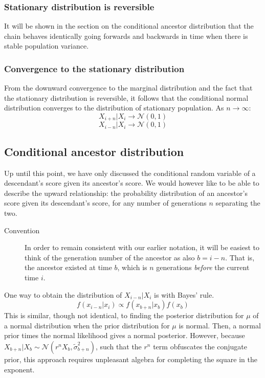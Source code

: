 \documentclass[letterpaper,10pt]{article} %
\begin{document}
\subsubsection*{Stationary distribution is reversible}
It will be shown in the section on the conditional ancestor distribution that the chain behaves identically going forwards and backwards in time when there is stable population variance.

\subsubsection*{Convergence to the stationary distribution}

From the downward convergence to the marginal distribution and the fact that the stationary distribution is reversible, it follows that the conditional normal distribution converges to the distribution of stationary population. 
As $n \rightarrow \infty$:
$$X_{i+n}|X_i \rightarrow \mathcal{N}(0, 1)$$
$$X_{i-n}|X_i \rightarrow \mathcal{N}(0, 1)$$



\subsection{Conditional ancestor distribution}

Up until this point, we have only discussed the conditional random variable of a descendant's score given its ancestor's score. We would however like to be able to describe the upward relationship: the probability distribution of an ancestor's score given its descendant's score, for any number of generations $n$ separating the two. 

\begin{description}
\item [Convention] In order to remain consistent with our earlier notation, it will be easiest to think of the generation number of the ancestor as also $b = i - n$. That is, the ancestor existed at time $b$, which is $n$ generations \emph{before} the current time $i$. 
\end{description}

One way to obtain the distribution of $X_{i-n}|X_i$ is with Bayes' rule. 
$$f(x_{i-n}|x_i) \propto f(x_{b+n}|x_b) f(x_b)$$
This is similar, though not identical, to finding the posterior distribution for $\mu$ of a normal distribution when the prior distribution for $\mu$ is normal. Then, a normal prior times the normal likelihood gives a normal posterior. However, because $X_{b+n}|X_b \sim \mathcal{N}(r^n X_b, \tilde{\sigma}_{b+n}^2)$, such that the $r^n$ term obfuscates the conjugate prior, this approach requires unpleasant algebra for completing the square in the exponent. 
\end{document}
